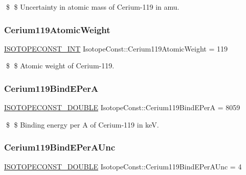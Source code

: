 \$ \$ Uncertainty in atomic mass of Cerium-\/119 in amu. \mbox{\label{group___isotope_const-_cerium-_ce119_gaf4895ef5f3fe8187e435c92707c36954}} 
\subsubsection{\texorpdfstring{Cerium119\+Atomic\+Weight}{Cerium119AtomicWeight}}
{\footnotesize\ttfamily \mbox{\hyperlink{group___isotope_const-_macros_ga5f18360b3e99483a35c32d789e62621c}{I\+S\+O\+T\+O\+P\+E\+C\+O\+N\+S\+T\+\_\+\+I\+NT}} Isotope\+Const\+::\+Cerium119\+Atomic\+Weight = 119}

\$ \$ Atomic weight of Cerium-\/119. \mbox{\label{group___isotope_const-_cerium-_ce119_ga92e0414277aae7686a4b9419895cc1f6}} 
\subsubsection{\texorpdfstring{Cerium119\+Bind\+E\+PerA}{Cerium119BindEPerA}}
{\footnotesize\ttfamily \mbox{\hyperlink{group___isotope_const-_macros_ga8f45a7272ce02c0b4c65c44636ed719a}{I\+S\+O\+T\+O\+P\+E\+C\+O\+N\+S\+T\+\_\+\+D\+O\+U\+B\+LE}} Isotope\+Const\+::\+Cerium119\+Bind\+E\+PerA = 8059}

\$ \$ Binding energy per A of Cerium-\/119 in keV. \mbox{\label{group___isotope_const-_cerium-_ce119_ga4d70bd0c3e0e120822bcda7c7e9e74bc}} 
\subsubsection{\texorpdfstring{Cerium119\+Bind\+E\+Per\+A\+Unc}{Cerium119BindEPerAUnc}}
{\footnotesize\ttfamily \mbox{\hyperlink{group___isotope_const-_macros_ga8f45a7272ce02c0b4c65c44636ed719a}{I\+S\+O\+T\+O\+P\+E\+C\+O\+N\+S\+T\+\_\+\+D\+O\+U\+B\+LE}} Isotope\+Const\+::\+Cerium119\+Bind\+E\+Per\+A\+Unc = 4}

